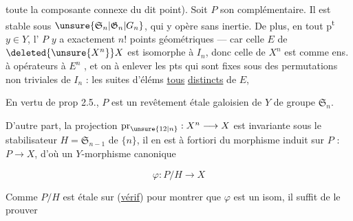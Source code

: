 toute la composante connexe du dit point). Soit $P$ son complémentaire. Il est  stable sous $\unsure{\mathfrak S_n|\mathfrak G_n|G_n}$, qui y opère sans inertie. De plus, en tout p\textsuperscript{t} $y\in Y$, l' $P$  $y$ a exactement $n!$ points géométriques --- car  celle $E$ de $\deleted{\unsure{X^n}}X$ est isomorphe à $I_n$, donc celle de $X^n$ est   comme ens. à opérateurs à $E^n$ , et on  à enlever les pts qui sont fixes sous des permutations non triviales de $I_n$ :  les suites d'éléms \uline{tous} \uline{distincts} de $E$, 

En vertu de prop 2.5., $P$ est  un revêtement étale galoisien de $Y$ de groupe $\mathfrak S_n$.

D'autre part,  la   projection $\mathrm{pr}_{\unsure{12|n}}:X^n\longrightarrow X$  est invariante sous le stabilisateur $H=\mathfrak S_{n-1}$ de $\{n\}$,  il en est à fortiori du morphisme induit sur $P$ : $P\longrightarrow X$, d'où un  $Y$-morphisme canonique

\[
\varphi:P/H\longrightarrow X
\]


Comme $P/H$ est étale sur  (\uline{vérif})  pour montrer que $\varphi$ est un isom, il suffit de le prouver



